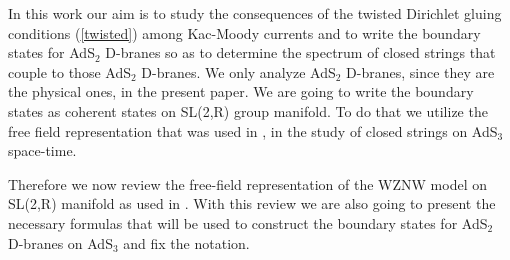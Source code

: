\documentclass[a4paper,12pt]{article}
\begin{document}
In this work our aim is to study the consequences of the twisted Dirichlet
gluing conditions (\ref{twisted}) among Kac-Moody currents and to write the
boundary states for AdS$_{2}$ D-branes so as to determine the spectrum of
closed strings that couple to those AdS$_{2}$ D-branes. We only analyze AdS$%
_{2}$ D-branes, since they are the physical ones, in the present paper. We
are going to write the boundary states as coherent states on SL(2,R) group
manifold. To do that we utilize the free field representation that was used
in \cite{bars1},\cite{BDM} in the study of closed strings on AdS$_{3}$
space-time.

Therefore we now review the free-field representation of the WZNW model on
SL(2,R) manifold as used in \cite{BDM}. With this review we are also going
to present the necessary formulas that will be used to construct the
boundary states for AdS$_{2}$ D-branes on AdS$_{3}$ and fix the notation.
\end{document}
